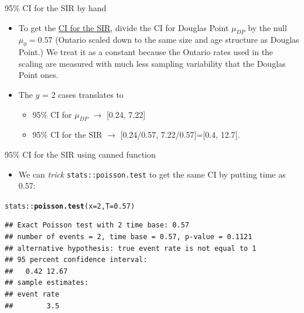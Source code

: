 \documentclass[10pt,handout]{beamer}\usepackage[]{graphicx}\usepackage[]{color}
\makeatletter
\newcommand{\hlnum}[1]{\textcolor[rgb]{0.686,0.059,0.569}{#1}}%
\newcommand{\hlopt}[1]{\textcolor[rgb]{0,0,0}{#1}}%
\newcommand{\hlstd}[1]{\textcolor[rgb]{0.345,0.345,0.345}{#1}}%
\newcommand{\hlkwc}[1]{\textcolor[rgb]{0.333,0.667,0.333}{#1}}%
\newcommand{\hlkwd}[1]{\textcolor[rgb]{0.737,0.353,0.396}{\textbf{#1}}}%
\newenvironment{kframe}{%
 \def\at@end@of@kframe{}%
 \ifinner\ifhmode%
  \def\at@end@of@kframe{\end{minipage}}%
  \begin{minipage}{\columnwidth}%
 \fi\fi%
 \def\FrameCommand##1{\hskip\@totalleftmargin \hskip-\fboxsep
 \colorbox{shadecolor}{##1}\hskip-\fboxsep
     \hskip-\linewidth \hskip-\@totalleftmargin \hskip\columnwidth}%
 \MakeFramed {\advance\hsize-\width
   \@totalleftmargin\z@ \linewidth\hsize
   \@setminipage}}%
 {\par\unskip\endMakeFramed%
 \at@end@of@kframe}
\newenvironment{knitrout}{}{} %
\makeatother
\begin{document}
\begin{frame}[fragile]{95\% CI for the SIR by hand}
	
	
	\small
	\begin{itemize}
		\setlength\itemsep{1.2em}
		
		\item To get the \underline{CI for the SIR}, divide the CI for Douglas Point $\mu_{DP}$ by the null $\mu_0 = 0.57$ (Ontario scaled down to the same size and age structure as Douglas Point.) We treat it as a constant because the Ontario rates used in the scaling are measured with much less sampling variability that the Douglas Point ones.
		
		\pause 
		
		\item The $y$ = 2 cases translates to
		\begin{itemize}
			\item 95\% CI for $\mu_{DP}$ $\to$ [0.24, 7.22]
			\item 95\% CI for the SIR $\to$ [0.24/0.57, 7.22/0.57]=[0.4, 12.7].
		\end{itemize}
	\end{itemize}
	
\end{frame}



\begin{frame}[fragile]{95\% CI for the SIR using canned function}
	
	
	\small
	\begin{itemize}
		\setlength\itemsep{1.2em}
		
		\item We can \textit{trick}  \texttt{stats::poisson.test} 
		to get the same CI by putting time as 0.57: 
		
		
	\end{itemize}
	
\begin{knitrout}\tiny
{}\color{fgcolor}\begin{kframe}
\begin{alltt}
\hlstd{stats}\hlopt{::}\hlkwd{poisson.test}\hlstd{(}\hlkwc{x}\hlstd{=}\hlnum{2}\hlstd{,}\hlkwc{T}\hlstd{=}\hlnum{0.57}\hlstd{)}
\end{alltt}
\begin{verbatim}
## Exact Poisson test with 2 time base: 0.57 
## number of events = 2, time base = 0.57, p-value = 0.1121
## alternative hypothesis: true event rate is not equal to 1 
## 95 percent confidence interval:
##   0.42 12.67 
## sample estimates:
## event rate 
##        3.5
\end{verbatim}
\end{kframe}
\end{knitrout}
	
\end{frame}
\end{document}
